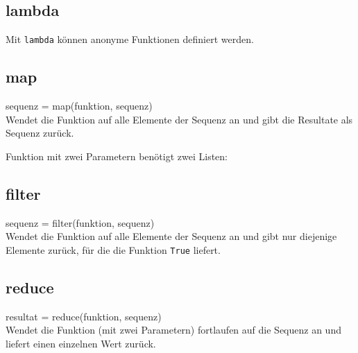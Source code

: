 \subsection{lambda}
Mit \texttt{lambda} können anonyme Funktionen definiert werden.


\subsection{map}
sequenz = map(funktion, sequenz)\\
Wendet die Funktion auf alle Elemente der Sequenz an und gibt die Resultate als Sequenz zurück.

Funktion mit zwei Parametern benötigt zwei Listen:


\subsection{filter}
sequenz = filter(funktion, sequenz)\\
Wendet die Funktion auf alle Elemente der Sequenz an und gibt nur diejenige Elemente zurück, für die die Funktion \texttt{True} liefert.


\subsection{reduce}
resultat = reduce(funktion, sequenz)\\
Wendet die Funktion (mit zwei Parametern) fortlaufen auf die Sequenz an und liefert einen einzelnen Wert zurück.
